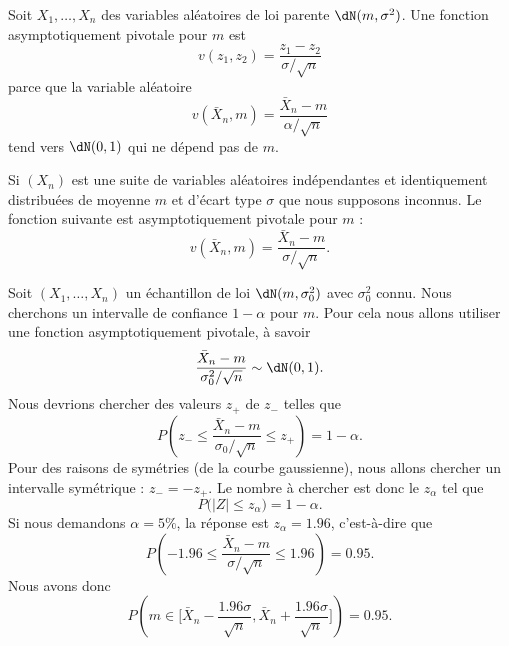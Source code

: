 \begin{example}
	Soit \( X_1,\ldots,X_n\) des variables aléatoires de loi parente \( \dN(m,\sigma^2)\). Une fonction asymptotiquement pivotale pour \( m\) est
	\begin{equation}
		v(z_1,z_2)=\frac{ z_1-z_2 }{ \sigma/\sqrt{n} }
	\end{equation}
	parce que la variable aléatoire
	\begin{equation}
		v(\bar X_n,m)=\frac{ \bar X_n-m }{ \alpha/\sqrt{n} }
	\end{equation}
	tend vers \( \dN(0,1)\) qui ne dépend pas de \( m\).
\end{example}

\begin{example}
	Si \( (X_n)\) est une suite de variables aléatoires indépendantes et identiquement distribuées de moyenne \( m\) et d'écart type \( \sigma\) que nous supposons inconnus. Le fonction suivante est asymptotiquement pivotale pour \( m\) :
	\begin{equation}
		v(\bar X_n,m)=\frac{ \bar X_n-m }{ \sigma/\sqrt{n} }.
	\end{equation}
\end{example}

Soit \( (X_1,\ldots,X_n)\) un échantillon de loi \( \dN(m,\sigma_0^2)\) avec \( \sigma_0^2\) connu. Nous cherchons un intervalle de confiance \( 1-\alpha\) pour \( m\). Pour cela nous allons utiliser une fonction asymptotiquement pivotale, à savoir
\begin{equation}
	\frac{ \bar X_n-m }{ \sigma_0^2/\sqrt{n} }\sim\dN(0,1).
\end{equation}
Nous devrions chercher des valeurs \( z_+\) de \( z_-\) telles que
\begin{equation}
	P\left( z_-\leq \frac{ \bar X_n-m }{ \sigma_0/\sqrt{n} }\leq z_+ \right)=1-\alpha.
\end{equation}
Pour des raisons de symétries (de la courbe gaussienne), nous allons chercher un intervalle symétrique : \( z_-=-z_+\). Le nombre à chercher est donc le \( z_{\alpha}\) tel que
\begin{equation}
	P\big( | Z |\leq z_{\alpha} \big)=1-\alpha.
\end{equation}
Si nous demandons \( \alpha=5\%\), la réponse est \( z_{\alpha}=1.96\), c'est-à-dire que
\begin{equation}
	P\left( -1.96\leq \frac{ \bar X_n-m }{ \sigma/\sqrt{n} }\leq 1.96 \right)=0.95.
\end{equation}
Nous avons donc
\begin{equation}
	P\left( m\in\big[ \bar X_n-\frac{ 1.96\sigma }{ \sqrt{n} },\bar X_n+\frac{ 1.96\sigma }{ \sqrt{n} } \big] \right)=0.95.
\end{equation}

